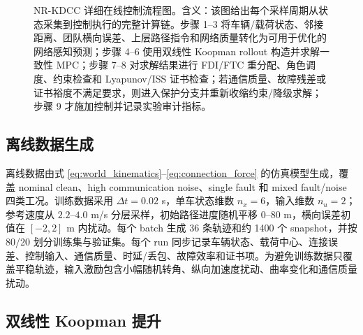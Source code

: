 \documentclass[twocolumn,3p,times,procedia]{elsarticle}
\newcommand{\Method}{NR-KDCC}
\begin{document}
\begin{figure}[t]
{}
\caption{\Method{} 详细在线控制流程图。含义：该图给出每个采样周期从状态采集到控制执行的完整计算链。步骤 1--3 将车辆/载荷状态、邻接距离、团队横向误差、上层路径指令和网络质量转化为可用于优化的网络感知预测；步骤 4--6 使用双线性 Koopman rollout 构造并求解一致性 MPC；步骤 7--8 对求解结果进行 FDI/FTC 重分配、角色调度、约束检查和 Lyapunov/ISS 证书检查；若通信质量、故障残差或证书裕度不满足要求，则进入保护分支并重新收缩约束/降级求解；步骤 9 才施加控制并记录实验审计指标。}
\label{fig:nrkdcc_flowchart}
\end{figure}

\subsection{离线数据生成}

离线数据由式 \eqref{eq:world_kinematics}--\eqref{eq:connection_force} 的仿真模型生成，覆盖 nominal clean、high communication noise、single fault 和 mixed fault/noise 四类工况。训练数据采用 $\Delta t=0.02$ s，单车状态维数 $n_x=6$，输入维数 $n_u=2$；参考速度从 $2.2$--$4.0$ m/s 分层采样，初始路径进度随机平移 $0$--$80$ m，横向误差初值在 $[-2,2]$ m 内扰动。每个 batch 生成 36 条轨迹和约 1400 个 snapshot，并按 80/20 划分训练集与验证集。每个 run 同步记录车辆状态、载荷中心、连接误差、控制输入、通信质量、时延/丢包、故障效率和证书项。为避免训练数据只覆盖平稳轨迹，输入激励包含小幅随机转角、纵向加速度扰动、曲率变化和通信质量扰动。

\subsection{双线性 Koopman 提升}
\end{document}
